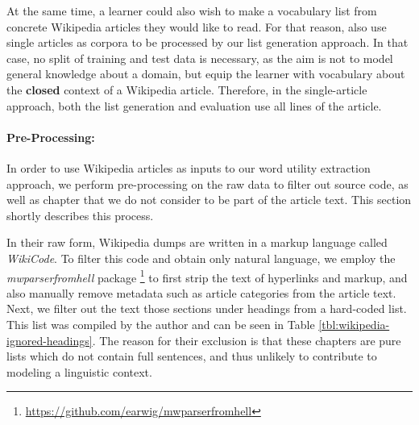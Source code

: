 At the same time, a learner could also wish to make a vocabulary list from concrete Wikipedia articles they would like to read.
For that reason, also use single articles as corpora to be processed by our list generation approach.
In that case, no split of training and test data is necessary, as the aim is not to model general knowledge about a domain, but equip the learner with vocabulary about the \textbf{closed} context of a Wikipedia article.
Therefore, in the single-article approach, both the list generation and evaluation use all lines of the article.




\paragraph{Pre-Processing:}
In order to use Wikipedia articles as inputs to our word utility extraction approach, we perform pre-processing on the raw data to filter out source code, as well as chapter that we do not consider to be part of the article text.
This section shortly describes this process.

In their raw form, Wikipedia dumps are written in a markup language called \textit{WikiCode}.
To filter this code and obtain only natural language, we employ the \textit{mwparserfromhell} package \footnote{\url{https://github.com/earwig/mwparserfromhell}} to first strip the text of hyperlinks and markup, and also manually remove metadata such as article categories from the article text.
Next, we filter out the text those sections under headings from a hard-coded list.
This list was compiled by the author and can be seen in Table \ref{tbl:wikipedia-ignored-headings}.
The reason for their exclusion is that these chapters are pure lists which do not contain full sentences, and thus unlikely to contribute to modeling a linguistic context.

